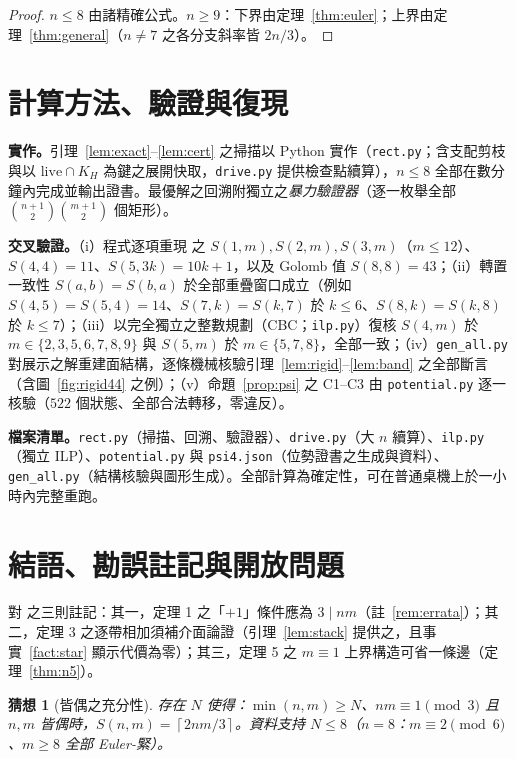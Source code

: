 \documentclass[11pt]{ctexart}
\newtheorem{conjecture}[theorem]{猜想}
\theoremstyle{definition}
\newcommand{\ceil}[1]{\left\lceil #1 \right\rceil}
\begin{document}
\begin{proof}
$n\le8$ 由諸精確公式。$n\ge9$：下界由定理~\ref{thm:euler}；上界由定理~\ref{thm:general}（$n\ne7$ 之各分支斜率皆 $2n/3$）。
\end{proof}

\section{計算方法、驗證與復現}\label{sec:comp}

\textbf{實作。}引理~\ref{lem:exact}--\ref{lem:cert} 之掃描以 Python 實作（\texttt{rect.py}；含支配剪枝與以 $\mathrm{live}\cap K_H$ 為鍵之展開快取，\texttt{drive.py} 提供檢查點續算），$n\le8$ 全部在數分鐘內完成並輸出證書。最優解之回溯附獨立之\emph{暴力驗證器}（逐一枚舉全部 $\binom{n+1}2\binom{m+1}2$ 個矩形）。

\textbf{交叉驗證。}（i）程式逐項重現 \cite{NT25} 之 $S(1,m),S(2,m),S(3,m)$（$m\le12$）、$S(4,4)=11$、$S(5,3k)=10k+1$，以及 Golomb 值 $S(8,8)=43$；（ii）轉置一致性 $S(a,b)=S(b,a)$ 於全部重疊窗口成立（例如 $S(4,5)=S(5,4)=14$、$S(7,k)=S(k,7)$ 於 $k\le6$、$S(8,k)=S(k,8)$ 於 $k\le7$）；（iii）以完全獨立之整數規劃（CBC；\texttt{ilp.py}）復核
$S(4,m)$ 於 $m\in\{2,3,5,6,7,8,9\}$ 與 $S(5,m)$ 於 $m\in\{5,7,8\}$，全部一致；（iv）\texttt{gen\_all.py} 對展示之解重建面結構，逐條機械核驗引理~\ref{lem:rigid}--\ref{lem:band} 之全部斷言（含圖~\ref{fig:rigid44} 之例）；（v）命題~\ref{prop:psi} 之 C1--C3 由 \texttt{potential.py} 逐一核驗（$522$ 個狀態、全部合法轉移，零違反）。

\textbf{檔案清單。}\texttt{rect.py}（掃描、回溯、驗證器）、\texttt{drive.py}（大 $n$ 續算）、\texttt{ilp.py}（獨立 ILP）、\texttt{potential.py} 與 \texttt{psi4.json}（位勢證書之生成與資料）、\texttt{gen\_all.py}（結構核驗與圖形生成）。全部計算為確定性，可在普通桌機上於一小時內完整重跑。

\section{結語、勘誤註記與開放問題}\label{sec:open}

對 \cite{NT25} 之三則註記：其一，定理 1 之「$+1$」條件應為 $3\mid nm$（註~\ref{rem:errata}）；其二，定理 3 之逐帶相加須補介面論證（引理~\ref{lem:stack} 提供之，且事實~\ref{fact:star} 顯示代價為零）；其三，定理 5 之 $m\equiv1$ 上界構造可省一條邊（定理~\ref{thm:n5}）。

\begin{conjecture}[皆偶之充分性]\label{conj:even}
存在 $N$ 使得：$\min(n,m)\ge N$、$nm\equiv1\pmod3$ 且 $n,m$ 皆偶時，$S(n,m)=\ceil{2nm/3}$。資料支持 $N\le8$（$n=8$：$m\equiv2\pmod6$、$m\ge8$ 全部 Euler-緊）。
\end{conjecture}
\end{document}
